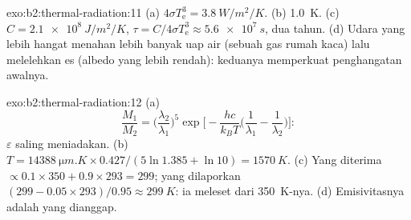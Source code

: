 \begin{solution}{exo:b2:thermal-radiation:11}
(a) $4\sigma T_{\text{e}}^3 = \qty{3.8}{W/m^2/K}$. (b) \qty{1.0}{K}. (c) $C =
\qty{2.1e8}{J/m^2/K}$, $\tau = C/4\sigma T_{\text{e}}^3 \approx \qty{5.6e7}{s}$, dua
tahun. (d) Udara yang lebih hangat menahan lebih banyak uap air (sebuah gas rumah kaca) lalu
melelehkan es (albedo yang lebih rendah): keduanya memperkuat penghangatan awalnya.
\end{solution}

\begin{solution}{exo:b2:thermal-radiation:12}
(a)
\[
\frac{M_1}{M_2} = \Big(\frac{\lambda_2}{\lambda_1}\Big)^5\exp\Big[-\frac{hc}{k_BT}\Big(\frac{1}{\lambda_1} - \frac{1}{\lambda_2}\Big)\Big] :
\]
$\varepsilon$ saling meniadakan. (b) $T = \qty{14388}{\micro m.K} \times 0.427/(5\ln 1.385 +
\ln 10) = \qty{1570}{K}$. (c) Yang diterima $\propto 0.1 \times 350 + 0.9 \times 293 =
299$; yang dilaporkan $(299 - 0.05 \times 293)/0.95 \approx \qty{299}{K}$: ia meleset dari
\qty{350}{K}-nya. (d) Emisivitasnya adalah yang dianggap.
\end{solution}

